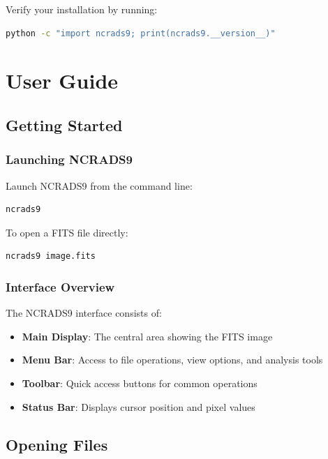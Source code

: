 \documentclass[11pt,a4paper]{report}
\begin{document}
Verify your installation by running:

\begin{lstlisting}[language=bash]
python -c "import ncrads9; print(ncrads9.__version__)"
\end{lstlisting}

\chapter{User Guide}

\section{Getting Started}

\subsection{Launching NCRADS9}

Launch NCRADS9 from the command line:

\begin{lstlisting}[language=bash]
ncrads9
\end{lstlisting}

To open a FITS file directly:

\begin{lstlisting}[language=bash]
ncrads9 image.fits
\end{lstlisting}

\subsection{Interface Overview}

The NCRADS9 interface consists of:

\begin{itemize}
    \item \textbf{Main Display}: The central area showing the FITS image
    \item \textbf{Menu Bar}: Access to file operations, view options, and analysis tools
    \item \textbf{Toolbar}: Quick access buttons for common operations
    \item \textbf{Status Bar}: Displays cursor position and pixel values
\end{itemize}

\section{Opening Files}
\end{document}
